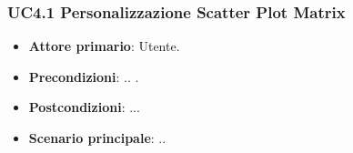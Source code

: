 \subsubsection{UC4.1 Personalizzazione Scatter Plot Matrix}
\begin{itemize}
	\item \textbf{Attore primario}: Utente.
	\item \textbf{Precondizioni}: .. .
	\item \textbf{Postcondizioni}: ...
	\item \textbf{Scenario principale}: ..
\end{itemize}